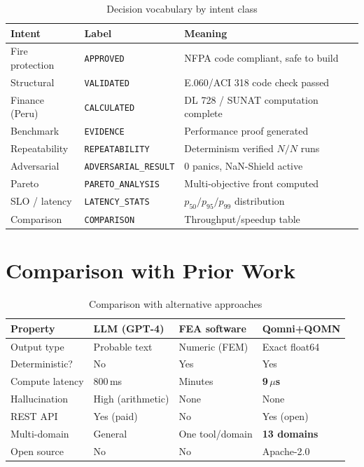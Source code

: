 \documentclass[11pt]{article}
\begin{document}
\begin{table}[h]
\centering
\caption{Decision vocabulary by intent class}
\begin{tabular}{lll}
\toprule
\textbf{Intent} & \textbf{Label} & \textbf{Meaning} \\
\midrule
Fire protection & \texttt{APPROVED}           & NFPA code compliant, safe to build \\
Structural      & \texttt{VALIDATED}          & E.060/ACI 318 code check passed \\
Finance (Peru)  & \texttt{CALCULATED}         & DL 728 / SUNAT computation complete \\
Benchmark       & \texttt{EVIDENCE}           & Performance proof generated \\
Repeatability   & \texttt{REPEATABILITY}      & Determinism verified $N/N$ runs \\
Adversarial     & \texttt{ADVERSARIAL\_RESULT}& 0 panics, NaN-Shield active \\
Pareto          & \texttt{PARETO\_ANALYSIS}   & Multi-objective front computed \\
SLO / latency   & \texttt{LATENCY\_STATS}     & $p_{50}/p_{95}/p_{99}$ distribution \\
Comparison      & \texttt{COMPARISON}         & Throughput/speedup table \\
\bottomrule
\end{tabular}
\end{table}

\section{Comparison with Prior Work}

\begin{table}[h]
\centering
\caption{Comparison with alternative approaches}
\begin{tabularx}{\textwidth}{lXXX}
\toprule
\textbf{Property} & \textbf{LLM (GPT-4)} & \textbf{FEA software} & \textbf{Qomni+QOMN} \\
\midrule
Output type     & Probable text         & Numeric (FEM)         & Exact float64 \\
Deterministic?  & No                    & Yes                   & Yes \\
Compute latency & 800\,ms               & Minutes               & \textbf{9\,$\mu$s} \\
Hallucination   & High (arithmetic)     & None                  & None \\
REST API        & Yes (paid)            & No                    & Yes (open) \\
Multi-domain    & General               & One tool/domain       & \textbf{13 domains} \\
Open source     & No                    & No                    & Apache-2.0 \\
\bottomrule
\end{tabularx}
\end{table}
\end{document}

